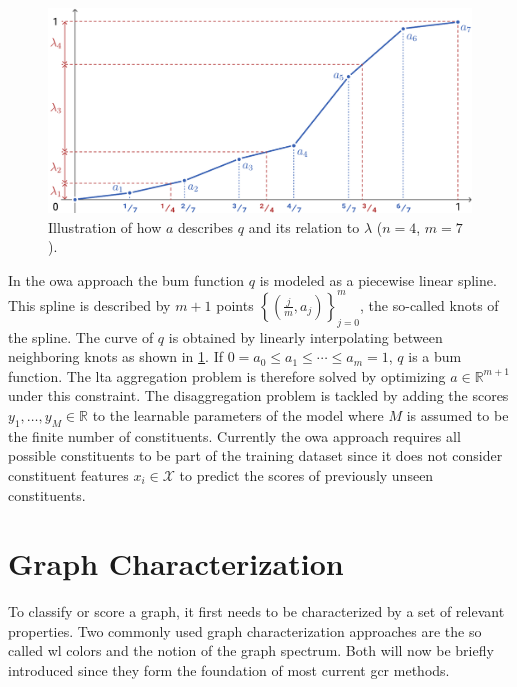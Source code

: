 \begin{figure}[h]
	\centering
	\includegraphics[width=0.75\linewidth]{gfx/related-work/bum.pdf}
	\caption[Illustration of how a \ac{bum} function is described as a linear spline and its relation to the \ac{owa} weights.]{
		Illustration of how \textcolor{t_blue}{$a$} describes \textcolor{t_blue}{$q$} and its relation to \textcolor{t_red}{$\lambda$} ($n = 4$, $m = 7$).
	}\label{fig:related:bum}
\end{figure}
In the \ac{owa} approach the \ac{bum} function $q$ is modeled as a piecewise linear spline.
This spline is described by $m+1$ points ${\left\{ \left( \frac{j}{m}, a_j \right) \right\}}_{j = 0}^{m}$, the so-called knots of the spline. %
The curve of $q$ is obtained by linearly interpolating between neighboring knots as shown in \cref{fig:related:bum}.
If $0 = a_0 \leq a_1 \leq \cdots \leq a_m = 1$, $q$ is a \ac{bum} function.
The \ac{lta} aggregation problem is therefore solved by optimizing $a \in \mathbb{R}^{m + 1}$ under this constraint.
The disaggregation problem is tackled by adding the scores $y_1, \dots, y_M \in \mathbb{R}$ to the learnable parameters of the model where $M$ is assumed to be the finite number of constituents.
Currently the \ac{owa} approach requires all possible constituents to be part of the training dataset since it does not consider constituent features $x_i \in \mathcal{X}$ to predict the scores of previously unseen constituents.

\section{Graph Characterization}%
\label{sec:related:character}

To classify or score a graph, it first needs to be characterized by a set of relevant properties.
Two commonly used graph characterization approaches are the so called \acf{wl} colors and the notion of the graph spectrum.
Both will now be briefly introduced since they form the foundation of most current \ac{gcr} methods.

